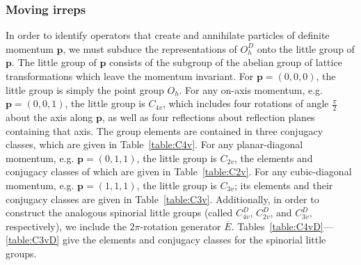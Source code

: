     \subsubsection{Moving irreps}
    In order to identify operators that create and annihilate particles of definite momentum $\boldsymbol p$, we must subduce the representations of $O_h^D$ onto the little group of $\boldsymbol p$. The little group of $\boldsymbol p$ consists of the subgroup of the abelian group of lattice transformations which leave the momentum invariant. For $\boldsymbol p = (0, 0, 0)$, the little group is simply the point group $O_h$. For any on-axis momentum, e.g. $\boldsymbol p = (0, 0, 1)$, the little group is $C_{4v}$, which includes four rotations of angle $\frac{\pi}{2}$ about the axis along $\boldsymbol p$, as well as four reflections about reflection planes containing that axis. The group elements are contained in three conjugacy classes, which are given in Table~\ref{table:C4v}.  For any planar-diagonal momentum, e.g. $\boldsymbol p = (0, 1, 1)$, the little group is $C_{2v}$, the elements and conjugacy classes of which are given in Table~\ref{table:C2v}. For any cubic-diagonal momentum, e.g. $\boldsymbol p = (1,1,1)$, the little group is $C_{3v}$; its elements and their conjugacy classes are given in Table~\ref{table:C3v}. Additionally, in order to construct the analogous spinorial little groups (called $C_{4v}^D$, $C_{2v}^D$, and $C_{3v}^D$, respectively), we include the $2\pi$-rotation generator $\overline E$. Tables~\ref{table:C4vD}---\ref{table:C3vD} give the elements and conjugacy classes for the spinorial little groups.
    
